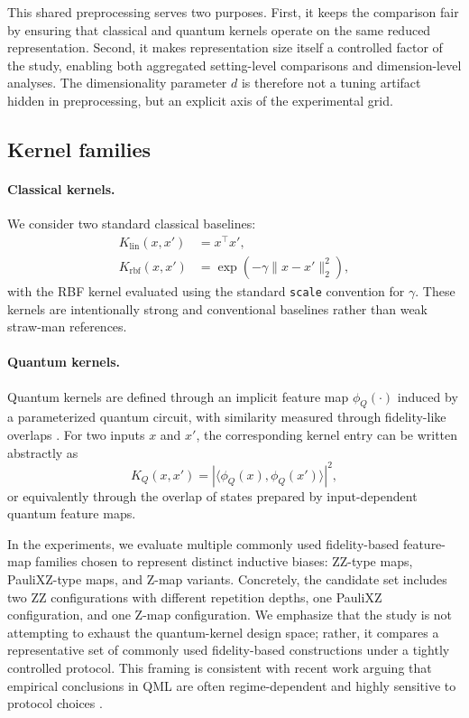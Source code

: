 \documentclass[pdflatex,sn-mathphys-num]{sn-jnl}%
\theoremstyle{thmstyleone}%
\theoremstyle{thmstyletwo}%
\theoremstyle{thmstylethree}%
\begin{document}
This shared preprocessing serves two purposes. First, it keeps the comparison fair by ensuring that classical and quantum kernels operate on the same reduced representation. Second, it makes representation size itself a controlled factor of the study, enabling both aggregated setting-level comparisons and dimension-level analyses. The dimensionality parameter $d$ is therefore not a tuning artifact hidden in preprocessing, but an explicit axis of the experimental grid.

\subsection{Kernel families}

\paragraph{Classical kernels.}
We consider two standard classical baselines:
\begin{align}
K_{\mathrm{lin}}(x,x') &= x^\top x',\\
K_{\mathrm{rbf}}(x,x') &= \exp\left(-\gamma\|x-x'\|_2^2\right),
\end{align}
with the RBF kernel evaluated using the standard \texttt{scale} convention for $\gamma$. These kernels are intentionally strong and conventional baselines rather than weak straw-man references.

\paragraph{Quantum kernels.}
Quantum kernels are defined through an implicit feature map $\phi_Q(\cdot)$ induced by a parameterized quantum circuit, with similarity measured through fidelity-like overlaps \cite{havlicek2019quantumenhanced,schuld2019featurehilbert,schuld2021kernelmethods}. For two inputs $x$ and $x'$, the corresponding kernel entry can be written abstractly as
\[
K_Q(x,x') = |\langle \phi_Q(x), \phi_Q(x') \rangle|^2,
\]
or equivalently through the overlap of states prepared by input-dependent quantum feature maps.

In the experiments, we evaluate multiple commonly used fidelity-based feature-map families chosen to represent distinct inductive biases: ZZ-type maps, PauliXZ-type maps, and Z-map variants. Concretely, the candidate set includes two ZZ configurations with different repetition depths, one PauliXZ configuration, and one Z-map configuration. We emphasize that the study is not attempting to exhaust the quantum-kernel design space; rather, it compares a representative set of commonly used fidelity-based constructions under a tightly controlled protocol. This framing is consistent with recent work arguing that empirical conclusions in QML are often regime-dependent and highly sensitive to protocol choices \cite{schuld2021encoding,bowles2024betterthanclassical,schnabel2025scrutiny}.
\end{document}
